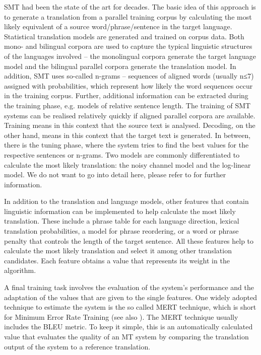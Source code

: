SMT had been the state of the art for decades. The basic idea of this approach is to generate a translation from a parallel training corpus by calculating the most likely equivalent of a source word/phrase/sentence in the target language. Statistical translation models are generated and trained on corpus data. Both mono- and bilingual corpora are used to capture the typical linguistic structures of the languages involved – the monolingual corpora generate the target language model and the bilingual parallel corpora generate the translation model. In addition, SMT uses so-called n-grams – sequences of aligned words (usually n≤7) assigned with probabilities, which represent how likely the word sequences occur in the training corpus. Further, additional information can be extracted during the training phase, e.g. models of relative sentence length. The training of SMT systems can be realised relatively quickly if aligned parallel corpora are available. Training means in this context that the source text is analysed. Decoding, on the other hand, means in this context that the target text is generated. In between, there is the tuning phase, where the system tries to find the best values for the respective sentences or n-grams. Two models are commonly differentiated to calculate the most likely translation: the noisy channel model and the log-linear model. We do not want to go into detail here, please refer to \citet{hearne2011statistical} for further information.

In addition to the translation and language models, other features that contain linguistic information can be implemented to help calculate the most likely translation. These include a phrase table for each language direction, lexical translation probabilities, a model for phrase reordering, or a word or phrase penalty that controls the length of the target sentence. All these features help to calculate the most likely translation and select it among other translation candidates. Each feature obtains a value that represents its weight in the algorithm.

A final training task involves the evaluation of the system’s performance and the adaptation of the values that are given to the single features. One widely adopted technique to estimate the system is the so called MERT technique, which is short for Minimum Error Rate Training (see also \citealt{och2003minimum}). The MERT technique usually includes the BLEU metric. To keep it simple, this is an automatically calculated value that evaluates the quality of an MT system by comparing the translation output of the system to a reference translation.

